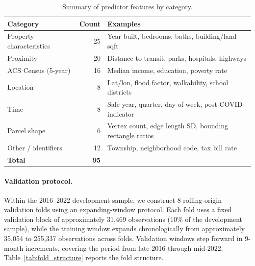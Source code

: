 \documentclass[12pt, draft]{article}
\theoremstyle{plain}
\theoremstyle{definition}
\newcommand{\1}{\mathbf{1}}
\begin{document}
\begin{table}[!ht]
\centering
\caption{Summary of predictor features by category.}
\label{tab:feature_groups}
\begin{tabular}{lrl}
\toprule
\textbf{Category} & \textbf{Count} & \textbf{Examples} \\
\midrule
Property characteristics & 25 & Year built, bedrooms, baths, building/land sqft \\
Proximity                & 20 & Distance to transit, parks, hospitals, highways \\
ACS Census (5-year)      & 16 & Median income, education, poverty rate \\
Location                 & 8  & Lat/lon, flood factor, walkability, school districts \\
Time                     & 8  & Sale year, quarter, day-of-week, post-COVID indicator \\
Parcel shape             & 6  & Vertex count, edge length SD, bounding rectangle ratios \\
Other / identifiers      & 12 & Township, neighborhood code, tax bill rate \\
\midrule
\textbf{Total}           & \textbf{95} & \\
\bottomrule
\end{tabular}
\end{table}

\paragraph{Validation protocol.} Within the 2016--2022 development sample, we construct 8 rolling-origin validation folds using an expanding-window protocol. Each fold uses a fixed validation block of approximately 31{,}469 observations (10\% of the development sample), while the training window expands chronologically from approximately 35{,}054 to 255{,}337 observations across folds. Validation windows step forward in 9-month increments, covering the period from late 2016 through mid-2022. Table~\ref{tab:fold_structure} reports the fold structure.
\end{document}
